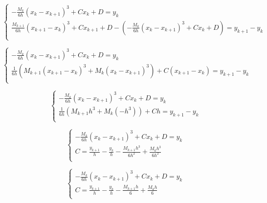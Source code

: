 \documentclass[12pt, letterpaper]{article}
\begin{document}
\begin{enumerate}
\begin{enumerate}
    \begin{equation*}
      \left\{
      \begin{array}{l}
        - \frac{M_k}{6h} (x_k - x_{k + 1})^3 + Cx_k + D = y_k \\
        \frac{M_{k + 1}}{6h} (x_{k + 1} - x_k)^3 + Cx_{k + 1} + D -
        \left (- \frac{M_k}{6h} (x_k - x_{k + 1})^3 + Cx_k + D \right)
        = y_{k + 1} - y_k\\
      \end{array}
      \right.
    \end{equation*}

    \begin{equation*}
      \left\{
      \begin{array}{l}
        - \frac{M_k}{6h} (x_k - x_{k + 1})^3 + Cx_k + D = y_k \\
        \frac{1}{6h} (M_{k + 1}(x_{k + 1} - x_k)^3 + M_k (x_k - x_{k +
          1})^3) + C (x_{k + 1} - x_k) = y_{k + 1} - y_k\\
      \end{array}
      \right.
    \end{equation*}

    \begin{equation*}
      \left\{
      \begin{array}{l}
        - \frac{M_k}{6h} (x_k - x_{k + 1})^3 + Cx_k + D = y_k \\
        \frac{1}{6h} (M_{k + 1} h^3 + M_k (-h^3)) + C h = y_{k + 1} - y_k\\
      \end{array}
      \right.
    \end{equation*}

    \begin{equation*}
      \left\{
      \begin{array}{l}
        - \frac{M_k}{6h} (x_k - x_{k + 1})^3 + Cx_k + D = y_k \\
        C = \frac{y_{k + 1}}{h} - \frac{y_k}{h} - \frac{M_{k
          + 1} h^3 }{6 h^2} + \frac{M_k h^3}{6h^2}\\
      \end{array}
      \right.
    \end{equation*}

    \begin{equation*}
      \left\{
      \begin{array}{l}
        - \frac{M_k}{6h} (x_k - x_{k + 1})^3 + Cx_k + D = y_k \\
        C = \frac{y_{k + 1}}{h} - \frac{y_k}{h} - \frac{M_{k
          + 1} h}{6} + \frac{M_k h}{6}\\
      \end{array}
      \right.
    \end{equation*}


\end{enumerate}
\end{enumerate}
\end{document}
